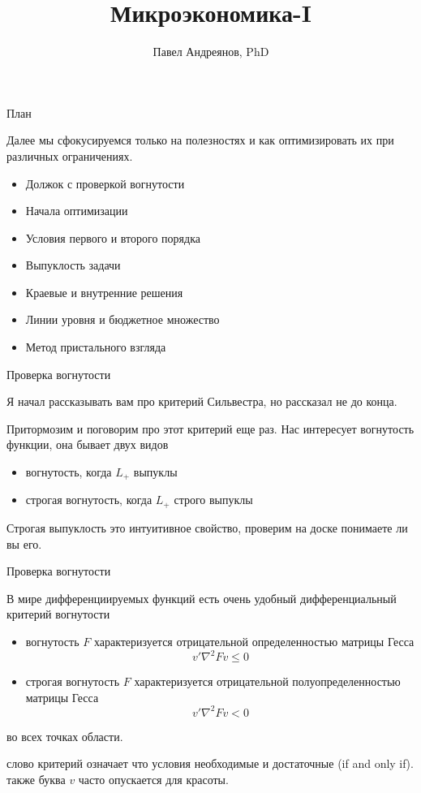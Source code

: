 \documentclass{beamer}
\title{
Микроэкономика-I
}
\author{
Павел Андреянов, PhD
}
\begin{document}
\maketitle

\begin{frame}{План}

Далее мы сфокусируемся только на полезностях и как оптимизировать их при различных ограничениях.

\begin{itemize}
  \item Должок с проверкой вогнутости
  \item Начала оптимизации
  \item Условия первого и второго порядка
  \item Выпуклость задачи
  \item Краевые и внутренние решения
  \item Линии уровня и бюджетное множество
  \item Метод пристального взгляда
\end{itemize}

\end{frame}

\begin{frame}{Проверка вогнутости}

Я начал рассказывать вам про критерий Сильвестра, но рассказал не до конца.

Притормозим и поговорим про этот критерий еще раз. Нас интересует вогнутость функции, она бывает двух видов

\begin{itemize}
\item вогнутость, когда $L_+$ выпуклы
\item строгая вогнутость, когда $L_+$ строго выпуклы
\end{itemize}

Строгая выпуклость это интуитивное свойство, проверим на доске понимаете ли вы его.

\end{frame}

\begin{frame}{Проверка вогнутости}

В мире дифференциируемых функций есть очень удобный \alert{дифференциальный критерий} вогнутости

\begin{itemize}
\item вогнутость $F$ характеризуется отрицательной определенностью матрицы Гесса$$v' \nabla^2 F v \leqslant 0$$
\item строгая вогнутость $F$ характеризуется отрицательной полуопределенностью матрицы Гесса$$v' \nabla^2 F v < 0$$
\end{itemize}
во всех точках области.

слово \alert{критерий} означает что условия необходимые и достаточные (if and only if). также буква $v$ часто опускается для красоты.

\end{frame}
\end{document}
